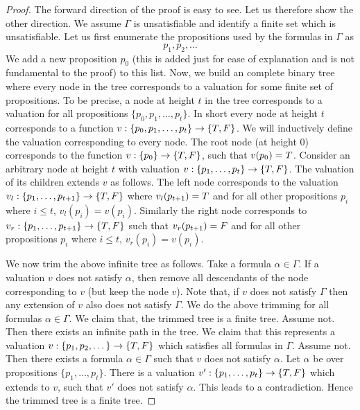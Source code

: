 \begin{proof}
The forward direction of the proof is easy to see. Let us therefore show the other direction. We assume $\Gamma$ is unsatisfiable and identify a finite set which is unsatisfiable. Let us first enumerate the propositions used by the formulas in $\Gamma$ as
\[
p_1,p_2,\dots 
\]
We add a new proposition $p_0$ (this is added just for ease of explanation and is not fundamental to the proof) to this list. Now, we build an complete binary tree where every node in the tree corresponds to a valuation for some finite set of propositions. To be precise, a node at height $t$ in the tree corresponds to a valuation for all propositions $\{p_0,p_1,\dots,p_t\}$. 
In short every node at height $t$ corresponds to a function $v: \{p_0,p_1,\dots,p_t\} \rightarrow \{T,F\}$. We will inductively define the valuation corresponding to every node. The root node (at height $0$) corresponds to the function $v:\{p_0\} \rightarrow \{T,F\}$, such that $v(p_0) = T$. Consider an arbitrary node at height $t$ with valuation $v:\{p_1,\dots,p_t\} \rightarrow \{T,F\}$. The valuation of its children extends $v$ as follows. The left node corresponds to the valuation $v_l:\{p_1,\dots,p_{t+1}\} \rightarrow \{T,F\}$ where $v_l(p_{t+1}) = T$ and for all other propositions $p_i$ where $i\leq t$, $v_l(p_i) = v(p_i)$. Similarly the right node corresponds to $v_r:\{p_1,\dots,p_{t+1}\} \rightarrow \{T,F\}$  such that $v_r(p_{t+1}) = F$ and for all other propositions $p_i$ where $i\leq t$, $v_r(p_i) = v(p_i)$. 

We now trim the above infinite tree as follows. Take a formula $\alpha \in \Gamma$. If a valuation $v$ does not satisfy $\alpha$, then remove all descendants of the node corresponding to $v$ (but keep the node $v$). Note that, if $v$ does not satisfy $\Gamma$ then any extension of $v$ also does not satisfy $\Gamma$. We do the above trimming for all formulas $\alpha \in \Gamma$. We claim that, the trimmed tree is a finite tree. Assume not. Then there exists an infinite path in the tree. We claim that this represents a valuation $v:\{p_1,p_2,\dots \} \rightarrow \{T,F\}$ which satisfies all formulas in $\Gamma$. Assume not. Then there exists a formula $\alpha \in \Gamma$ such that $v$ does not satisfy $\alpha$. Let $\alpha$ be over propositions $\{p_1,\dots,p_t\}$. There is a valuation $v':\{p_1,\dots,p_t\} \rightarrow \{T,F\}$ which extends to $v$, such that $v'$ does not satisfy $\alpha$. This leads to a contradiction. Hence the trimmed tree is a finite tree.


\end{proof}
